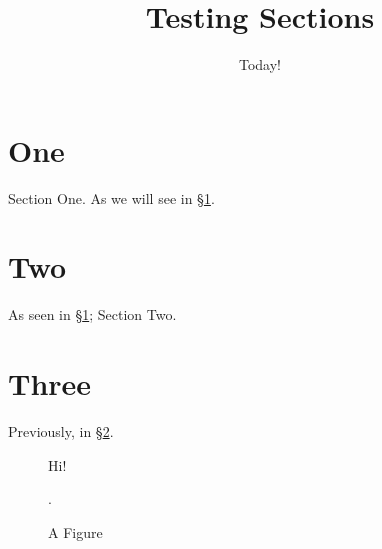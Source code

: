 \documentclass{article}
\title{Testing Sections}
\date{Today!}
\begin{document}
\maketitle
\section{One}\label{sec:one}
Section One. As we will see in \S\ref{fig_three}.
\section{Two}\label{sec:two}
As seen in \S\ref{sec:one}; Section Two.
\section{Three}\label{sec:three}
Previously, in \S\ref{sec:two}.
\begin{figure}
Hi!
\caption{A Figure\label{fig_three}}.
\end{figure}
\end{document}
